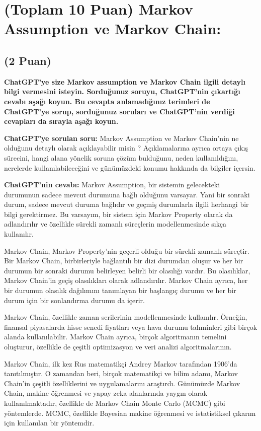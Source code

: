 \documentclass[11pt]{article}
\begin{document}
\section{(Toplam 10 Puan) Markov Assumption ve Markov Chain:}

\subsection{(2 Puan)} \textbf{ChatGPT’ye size Markov assumption ve Markov Chain ilgili detaylı bilgi vermesini isteyin. Sorduğunuz soruyu, ChatGPT'nin çıkartığı cevabı aşağı koyun. Bu cevapta anlamadığınız terimleri de ChatGPT’ye sorup, sorduğunuz soruları ve ChatGPT’nin verdiği cevapları da sırayla aşağı koyun.}

\textbf{ChatGPT'ye sorulan soru: } Markov Assumption ve Markov Chain'nin ne olduğunu detaylı olarak açıklayabilir misin ? Açıklamalarına ayrıca ortaya çıkış sürecini, hangi alana yönelik soruna çözüm bulduğunu, neden kullanıldığını, nerelerde kullanılabileceğini ve günümüzdeki konumu hakkında da bilgiler içersin.

\textbf{ChatGPT'nin cevabı: } Markov Assumption, bir sistemin gelecekteki durumunun sadece mevcut durumuna bağlı olduğunu varsayar. Yani bir sonraki durum, sadece mevcut duruma bağlıdır ve geçmiş durumlarla ilgili herhangi bir bilgi gerektirmez. Bu varsayım, bir sistem için Markov Property olarak da adlandırılır ve özellikle sürekli zamanlı süreçlerin modellenmesinde sıkça kullanılır.

Markov Chain, Markov Property'nin geçerli olduğu bir sürekli zamanlı süreçtir. Bir Markov Chain, birbirleriyle bağlantılı bir dizi durumdan oluşur ve her bir durumun bir sonraki durumu belirleyen belirli bir olasılığı vardır. Bu olasılıklar, Markov Chain'in geçiş olasılıkları olarak adlandırılır. Markov Chain ayrıca, her bir durumun olasılık dağılımını tanımlayan bir başlangıç durumu ve her bir durum için bir sonlandırma durumu da içerir.

Markov Chain, özellikle zaman serilerinin modellenmesinde kullanılır. Örneğin, finansal piyasalarda hisse senedi fiyatları veya hava durumu tahminleri gibi birçok alanda kullanılabilir. Markov Chain ayrıca, birçok algoritmanın temelini oluşturur, özellikle de çeşitli optimizasyon ve veri analizi algoritmalarının.

Markov Chain, ilk kez Rus matematikçi Andrey Markov tarafından 1906'da tanıtılmıştır. O zamandan beri, birçok matematikçi ve bilim adamı, Markov Chain'in çeşitli özelliklerini ve uygulamalarını araştırdı. Günümüzde Markov Chain, makine öğrenmesi ve yapay zeka alanlarında yaygın olarak kullanılmaktadır, özellikle de Markov Chain Monte Carlo (MCMC) gibi yöntemlerde. MCMC, özellikle Bayesian makine öğrenmesi ve istatistiksel çıkarım için kullanılan bir yöntemdir.
\end{document}
